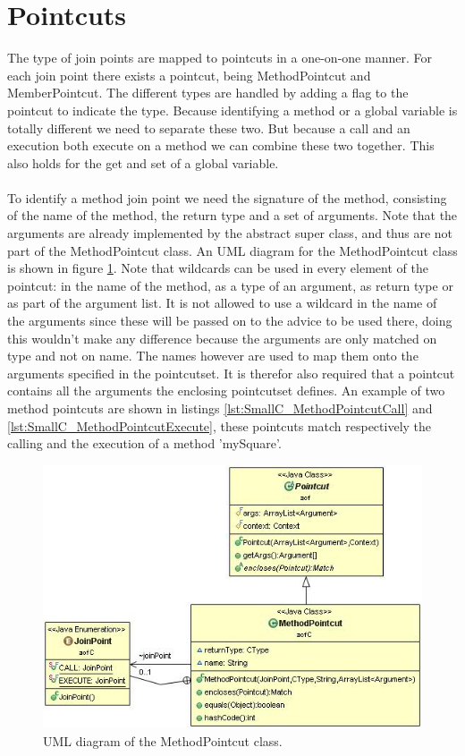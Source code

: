 \documentclass[a4paper]{report}
\begin{document}
\section{Pointcuts}
The type of join points are mapped to pointcuts in a one-on-one manner. For each join point there exists a pointcut, being MethodPointcut and MemberPointcut. The different types are handled by adding a flag to the pointcut to indicate the type. Because identifying a method or a global variable is totally different we need to separate these two. But because a call and an execution both execute on a method we can combine these two together. This also holds for the get and set of a global variable.\\
\\
To identify a method join point we need the signature of the method, consisting of the name of the method, the return type and a set of arguments. Note that the arguments are already implemented by the abstract super class, and thus are not part of the MethodPointcut class. An UML diagram for the MethodPointcut class is shown in figure \ref{fig:MethodPointcut}. Note that wildcards can be used in every element of the pointcut: in the name of the method, as a type of an argument, as  return type or as part of the argument list. It is not allowed to use a wildcard in the name of the arguments since these will be passed on to the advice to be used there, doing this wouldn't make any difference because the arguments are only matched on type and not on name. The names however are used to map them onto the arguments specified in the pointcutset. It is therefor also required that a pointcut contains all the arguments the enclosing pointcutset defines. An example of two method pointcuts are shown in listings \ref{lst:SmallC_MethodPointcutCall} and \ref{lst:SmallC_MethodPointcutExecute}, these pointcuts match respectively the calling and the execution of a method 'mySquare'.\\
\begin{figure}
\centering
\includegraphics[scale=0.7]{images/AOFC/MethodPointcut.jpg}
\caption{UML diagram of the MethodPointcut class.}
\label{fig:MethodPointcut}
\end{figure}\\
\end{document}
